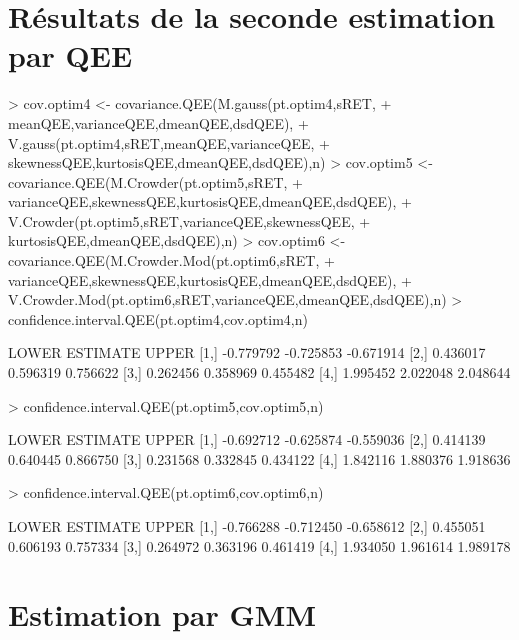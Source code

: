 \documentclass[letter]{report}
\begin{document}
\section{Résultats de la seconde estimation par QEE}

\begin{Schunk}
\begin{Sinput}
> cov.optim4 <- covariance.QEE(M.gauss(pt.optim4,sRET,
+ 				meanQEE,varianceQEE,dmeanQEE,dsdQEE),
+ 		V.gauss(pt.optim4,sRET,meanQEE,varianceQEE,
+ 				skewnessQEE,kurtosisQEE,dmeanQEE,dsdQEE),n)
> cov.optim5 <- covariance.QEE(M.Crowder(pt.optim5,sRET,
+ 				varianceQEE,skewnessQEE,kurtosisQEE,dmeanQEE,dsdQEE),
+ 		V.Crowder(pt.optim5,sRET,varianceQEE,skewnessQEE,
+ 				kurtosisQEE,dmeanQEE,dsdQEE),n)
> cov.optim6 <- covariance.QEE(M.Crowder.Mod(pt.optim6,sRET,
+ 				varianceQEE,skewnessQEE,kurtosisQEE,dmeanQEE,dsdQEE),
+ 		V.Crowder.Mod(pt.optim6,sRET,varianceQEE,dmeanQEE,dsdQEE),n)
> confidence.interval.QEE(pt.optim4,cov.optim4,n)
\end{Sinput}
\begin{Soutput}
         LOWER  ESTIMATE     UPPER
[1,] -0.779792 -0.725853 -0.671914
[2,]  0.436017  0.596319  0.756622
[3,]  0.262456  0.358969  0.455482
[4,]  1.995452  2.022048  2.048644
\end{Soutput}
\begin{Sinput}
> confidence.interval.QEE(pt.optim5,cov.optim5,n)
\end{Sinput}
\begin{Soutput}
         LOWER  ESTIMATE     UPPER
[1,] -0.692712 -0.625874 -0.559036
[2,]  0.414139  0.640445  0.866750
[3,]  0.231568  0.332845  0.434122
[4,]  1.842116  1.880376  1.918636
\end{Soutput}
\begin{Sinput}
> confidence.interval.QEE(pt.optim6,cov.optim6,n)
\end{Sinput}
\begin{Soutput}
         LOWER  ESTIMATE     UPPER
[1,] -0.766288 -0.712450 -0.658612
[2,]  0.455051  0.606193  0.757334
[3,]  0.264972  0.363196  0.461419
[4,]  1.934050  1.961614  1.989178
\end{Soutput}
\end{Schunk}

\section{Estimation par GMM}
\end{document}
